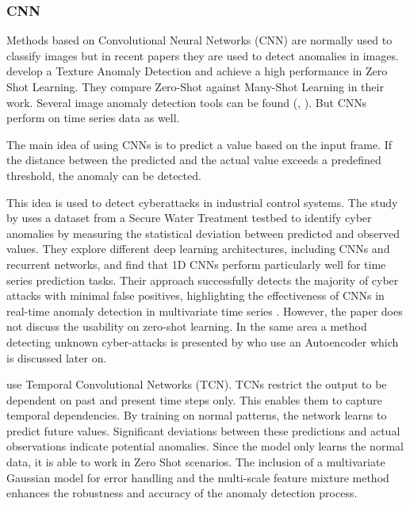 \subsubsection{CNN}
Methods based on Convolutional Neural Networks (CNN) are normally used to classify images but in recent papers they are used to detect anomalies in images. \cite{aota_zero-shot_2023} develop a Texture Anomaly Detection and achieve a high performance in Zero Shot Learning. They compare Zero-Shot against Many-Shot Learning in their work. Several image anomaly detection tools can be found (\cite{sabokrou_deep-anomaly__2018}, \cite{aota_zero-shot_2023}). But CNNs perform on time series data as well.

The main idea of using CNNs is to predict a value based on the input frame. If the distance between the predicted and the actual value exceeds a predefined threshold, the anomaly can be detected.

This idea is used to detect cyberattacks in industrial control systems. The study by \cite{kravchik_detecting_2018} uses a dataset from a Secure Water Treatment testbed to identify cyber anomalies by measuring the statistical deviation between predicted and observed values. They explore different deep learning architectures, including CNNs and recurrent networks, and find that 1D CNNs perform particularly well for time series prediction tasks. Their approach successfully detects the majority of cyber attacks with minimal false positives, highlighting the effectiveness of CNNs in real-time anomaly detection in multivariate time series \cite{kravchik_detecting_2018}. However, the paper does not discuss the usability on zero-shot learning. In the same area a method detecting unknown cyber-attacks is presented by \cite{zhang_unknown_2020} who use an Autoencoder which is discussed later on.

\cite{he_temporal_2019} use Temporal Convolutional Networks (TCN). TCNs restrict the output to be dependent on past and present time steps only. This enables them to capture temporal dependencies. By training on normal patterns, the network learns to predict future values. Significant deviations between these predictions and actual observations indicate potential anomalies. Since the model only learns the normal data, it is able to work in Zero Shot scenarios. The inclusion of a multivariate Gaussian model for error handling and the multi-scale feature mixture method enhances the robustness and accuracy of the anomaly detection process.

